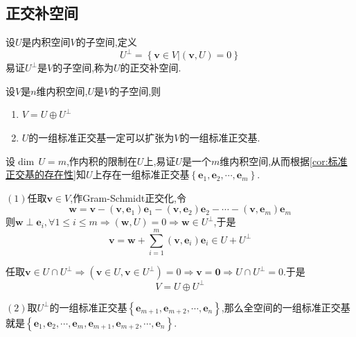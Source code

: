 \subsection{正交补空间}
\begin{formal}
    \begin{definition}[正交补空间的定义]\label{def:正交补空间的定义}
        设$U$是内积空间$V$的子空间,定义\[
        U^{\perp}=\left\{
            \bm{v}\in V|\left(\bm{v},U\right)=0\right\}
        \]易证$U^{\perp}$是$V$的子空间,称为$U$的正交补空间.
    \end{definition}
\end{formal}
\begin{formal}
    \begin{theorem}[正交补空间]\label{thm:正交补空间}
        设$V$是$n$维内积空间,$U$是$V$的子空间,则\begin{enumerate}[label={\textup{(\arabic*)}}]
            \item $\displaystyle V=U\oplus U^{\perp}$
            \item $U$的一组标准正交基一定可以扩张为$V$的一组标准正交基. 
        \end{enumerate}
    \end{theorem}
    \begin{Proof}
        设$\dim\,U=m$,作内积的限制在$U$上,易证$U$是一个$m$维内积空间,从而根据\cref{cor:标准正交基的存在性}知$U$上存在一组标准正交基$\left\{\bm{e}_1,\bm{e}_2,\cdots,\bm{e}_m\right\}$.
        
        $(1)$任取$\bm{v}\in V$,作\textup{Gram-Schmidt}正交化,令\[
        \bm{w}=\bm{v}-\left(
            \bm{v},\bm{e}_1
        \right)\bm{e}_1-\left(
            \bm{v},\bm{e}_2
        \right)\bm{e}_2-\cdots-\left(
            \bm{v},\bm{e}_m
        \right)\bm{e}_m
        \]则$\bm{w}\perp\bm{e}_i,\forall1\leqslant i\leqslant m\Longrightarrow\left(\bm{w},U\right)=0\Longrightarrow\bm{w}\in U^{\perp}$,于是\[
        \bm{v}=\bm{w}+\sum_{i=1}^{m}\left(
            \bm{v},\bm{e}_i
        \right)\bm{e}_i\in U+U^{\perp}
        \]

        任取$\bm{v}\in U\cap U^{\perp}\Longrightarrow\left(\bm{v}\in U,\bm{v}\in U^{\perp}\right)=0\Longrightarrow\bm{v}=\bm{0}\Longrightarrow U\cap U^{\perp}=0$.于是\[
        V=U\oplus U^{\perp}
        \]

        $(2)$取$U^{\perp}$的一组标准正交基$\left\{
            \bm{e}_{m+1},\bm{e}_{m+2},\cdots,\bm{e}_n
        \right\}$,那么全空间的一组标准正交基就是$\left\{
            \bm{e}_1,\bm{e}_2,\cdots,\bm{e}_m,\bm{e}_{m+1},\bm{e}_{m+2},\cdots,\bm{e}_n
        \right\}$.
    \end{Proof}
\end{formal}
